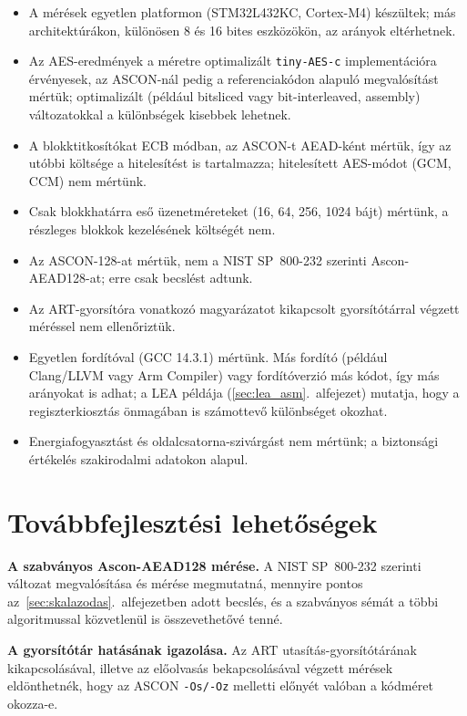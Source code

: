 \documentclass[a4paper,12pt]{report}
\theoremstyle{definition}
\theoremstyle{remark}
\begin{document}
\begin{itemize}
	\item A mérések egyetlen platformon (STM32L432KC, Cortex-M4) készültek; más architektúrákon, különösen 8 és 16 bites eszközökön, az arányok eltérhetnek.
	\item Az AES-eredmények a méretre optimalizált \texttt{tiny-AES-c} implementációra érvényesek, az ASCON-nál pedig a referenciakódon alapuló megvalósítást mértük; optimalizált (például bitsliced vagy bit-interleaved, assembly) változatokkal a különbségek kisebbek lehetnek.
	\item A blokktitkosítókat ECB módban, az ASCON-t AEAD-ként mértük, így az utóbbi költsége a hitelesítést is tartalmazza; hitelesített AES-módot (GCM, CCM) nem mértünk.
	\item Csak blokkhatárra eső üzenetméreteket (16, 64, 256, 1024 bájt) mértünk, a részleges blokkok kezelésének költségét nem.
	\item Az ASCON-128-at mértük, nem a NIST SP~800-232 szerinti Ascon-AEAD128-at; erre csak becslést adtunk.
	\item Az ART-gyorsítóra vonatkozó magyarázatot kikapcsolt gyorsítótárral végzett méréssel nem ellenőriztük.
	\item Egyetlen fordítóval (GCC 14.3.1) mértünk. Más fordító (például Clang/LLVM vagy Arm Compiler) vagy fordítóverzió más kódot, így más arányokat is adhat; a LEA példája (\ref{sec:lea_asm}.~alfejezet) mutatja, hogy a regiszterkiosztás önmagában is számottevő különbséget okozhat.
	\item Energiafogyasztást és oldalcsatorna-szivárgást nem mértünk; a biztonsági értékelés szakirodalmi adatokon alapul.
\end{itemize}

\section{Továbbfejlesztési lehetőségek}\label{sec:tovabbfejlesztes}

\textbf{A szabványos Ascon-AEAD128 mérése.} A NIST SP~800-232 szerinti változat megvalósítása és mérése megmutatná, mennyire pontos az~\ref{sec:skalazodas}.~alfejezetben adott becslés, és a szabványos sémát a többi algoritmussal közvetlenül is összevethetővé tenné.

\textbf{A gyorsítótár hatásának igazolása.} Az ART utasítás-gyorsítótárának kikapcsolásával, illetve az előolvasás bekapcsolásával végzett mérések eldönthetnék, hogy az ASCON \texttt{-Os/-Oz} melletti előnyét valóban a kódméret okozza-e.
\end{document}
